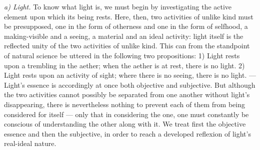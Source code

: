 \documentclass[12pt,a4paper]{book}
\newcommand{\runin}[1]{\emph{#1}\hspace{0.4em}}
\begin{document}
\runin{a) Light.} To know what light is, we must begin by investigating the active element upon which its being rests.
Here, then, two activities of unlike kind must be presupposed, one in the form of otherness and one in the form of
selfhood, a making-visible and a seeing, a material and an ideal activity: light itself is the reflected unity of the
two activities of unlike kind. This can from the standpoint of natural science be uttered in the following two
propositions: 1) Light rests upon a trembling in the aether; when the aether is at rest, there is no light. 2) Light
rests upon an activity of sight; where there is no seeing, there is no light. --- Light's essence is accordingly at
once both objective and subjective. But although the two activities cannot possibly be separated from one another
without light's disappearing, there is nevertheless nothing to prevent each of them from being considered for itself
--- only that in considering the one, one must constantly be conscious of understanding the other along with it. We
treat first the objective essence and then the subjective, in order to reach a developed reflexion of light's real-ideal
nature.
\end{document}

